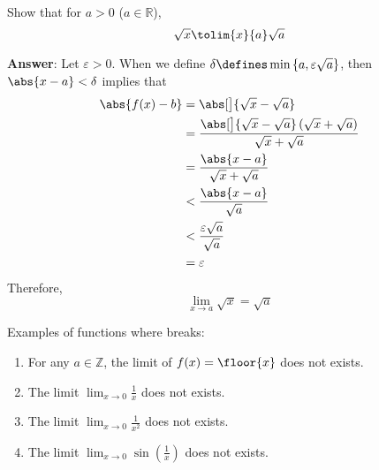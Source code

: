 \begin{exm}\label{exm-epsilon-delta-definition-limit:5}
	Show that for $a>0$ ($a\in\mathbb{R}$),
	\begin{equation*}
		\sqrt{x}\tolim{x}{a}\sqrt{a}
	\end{equation*}
	\begin{flushleft}
		\textbf{Answer}: Let $\varepsilon>0$. When we define $\delta\defines\min\left\{a,\varepsilon\sqrt{a}\right\}$,
		then $\abs{x-a}<\delta$ implies that
		\begin{align*}
			\abs{f(x)-b} & =\abs[\big]{\sqrt{x}-\sqrt{a}}                                                         \\
			             & =\frac{\abs[\big]{\sqrt{x}-\sqrt{a}}\left(\sqrt{x}+\sqrt{a}\right)}{\sqrt{x}+\sqrt{a}} \\
			             & =\frac{\abs{x-a}}{\sqrt{x}+\sqrt{a}}                                                   \\
			             & <\frac{\abs{x-a}}{\sqrt{a}}                                                            \\
			             & <\frac{\varepsilon\sqrt{a}}{\sqrt{a}}                                                  \\
			             & =\varepsilon
		\end{align*}
		Therefore,
		\begin{equation*}
			\lim_{x\to a}\sqrt{x}=\sqrt{a}
		\end{equation*}
	\end{flushleft}
\end{exm}

\begin{rem}\label{rem-undefined-limits}
	Examples of functions where  breaks:
	\begin{enumerate}
		\item For any $a\in\mathbb{Z}$, the limit of $f(x)=\floor{x}$ does not exists.
		\item The limit $\displaystyle\lim_{x\to0}\tfrac{1}{x}$ does not exists.
		\item The limit $\displaystyle\lim_{x\to0}\tfrac{1}{x^2}$ does not exists.
		\item The limit $\displaystyle\lim_{x\to0}\sin\left(\tfrac{1}{x}\right)$ does not exists.
	\end{enumerate}
\end{rem}

